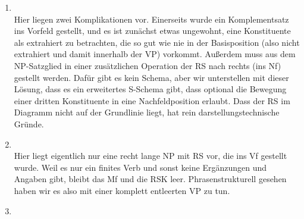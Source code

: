 \begin{enumerate}
  \item\label{it:99001}
    \\

    Hier liegen zwei Komplikationen vor.
    Einerseits wurde ein Komplementsatz ins Vorfeld gestellt, und es ist zunächst etwas ungewohnt, eine Konstituente als extrahiert zu betrachten, die so gut wie nie in der Basisposition (also nicht extrahiert und damit innerhalb der VP) vorkommt.
    Außerdem muss aus dem NP-Satzglied in einer zusätzlichen Operation der RS nach rechts (ins Nf) gestellt werden.
    Dafür gibt es kein Schema, aber wir unterstellen mit dieser Lösung, dass es ein erweitertes S-Schema gibt, dass optional die Bewegung einer dritten Konstituente in eine Nachfeldposition erlaubt.
    Dass der RS im Diagramm nicht auf der Grundlinie liegt, hat rein darstellungstechnische Gründe.

  \item\label{it:99002}
    \\

    Hier liegt eigentlich nur eine recht lange NP mit RS vor, die ins Vf gestellt wurde.
    Weil es nur ein finites Verb und sonst keine Ergänzungen und Angaben gibt, bleibt das Mf und die RSK leer.
    Phrasenstrukturell gesehen haben wir es also mit einer komplett entleerten VP zu tun.
  \item
    \\


\end{enumerate}
